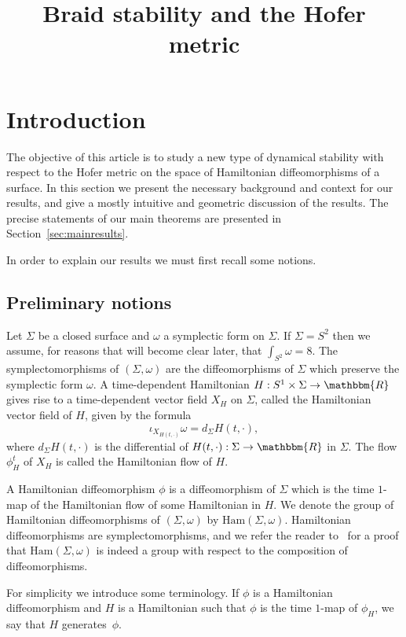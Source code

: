 \documentclass[AHL,Unicode,longabstracts,published]{cedram}
\title[Braid stability and the Hofer metric]{Braid stability and the Hofer metric}
\author[\initial{M.R.R.} \lastname{Alves}]{\firstname{Marcelo R.R.} \lastname{Alves}}
\author[\initial{M.} \lastname{Meiwes}]{\firstname{Matthias} \lastname{Meiwes}}
\newcommand{\R}{\mathbbm{R}}
\newcommand{\Ham}{\mathrm{Ham}}
\begin{document}
\maketitle
\setcounter{tocdepth}{2}
\tableofcontents

\break
\section{Introduction}

The objective of this article is to study a new type of dynamical stability with respect to the Hofer metric on the space of Hamiltonian diffeomorphisms of a surface. In this section we present the necessary background and context for our results, and give a mostly intuitive and geometric discussion of the results. The precise statements of our main theorems are presented in Section~\ref{sec:mainresults}.


In order to explain our results we must first recall some notions.


\subsection{Preliminary notions}
Let $\Sigma$ be a closed surface and $\omega$ a symplectic form on $\Sigma$. If $\Sigma = S^2$ then we assume, for reasons that will become clear later, that $\int_{S^2} \omega = 8$. The symplectomorphisms of $(\Sigma,\omega)$ are the diffeomorphisms of $\Sigma$ which preserve the symplectic form $\omega$. A time-dependent Hamiltonian $H:S^1 \times \Sigma \to \R$ gives rise to a time-dependent vector field $X_H$ on $\Sigma$, called the Hamiltonian vector field of $H$, given by the formula
\begin{equation}
\iota_{X_{H(t,\cdot)}} \omega = d_\Sigma H(t,\cdot),
\end{equation}
where $d_\Sigma H(t,\cdot)$ is the differential of $H(t, \cdot) : \Sigma \to \R$ in $\Sigma$. The flow $\phi^t_H$ of $X_H$ is called the Hamiltonian flow of $H$.

A Hamiltonian diffeomorphism $\phi$ is a diffeomorphism of $\Sigma$ which is the time $1$-map of the Hamiltonian flow of some Hamiltonian in $H$. We denote the group of Hamiltonian diffeomorphisms of $(\Sigma, \omega)$ by $\Ham(\Sigma,\omega)$. Hamiltonian diffeomorphisms are symplectomorphisms, and we refer the reader to~\cite{leonidsbook} for a proof that $\Ham(\Sigma,\omega)$ is indeed a group with respect to the composition of diffeomorphisms.

For simplicity we introduce some terminology. If $\phi$ is a Hamiltonian diffeomorphism and $H$ is a Hamiltonian such that $\phi$ is the time $1$-map of $\phi_H$, we say that $H$ generates~$\phi$.
\end{document}
